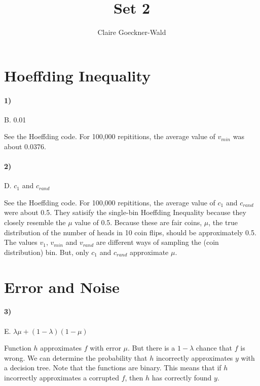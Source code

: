 \documentclass[10pt,letter]{article}
\begin{document}
\title{Set 2}
\author{Claire Goeckner-Wald}
\maketitle 

\section*{Hoeffding Inequality}

\paragraph{1)} B. 0.01

	See the Hoeffding code. For 100,000 repititions, the average value of $v_{min}$ was about 0.0376.

\paragraph{2)} D. $c_1$ and $c_{rand}$

	See the Hoeffding code. For 100,000 repititions, the average value of $c_1$ and $c_{rand}$ were about 0.5. They satisify the single-bin Hoeffding Inequality because they closely resemble the $\mu$ value of 0.5. Because these are fair coins, $\mu$, the true distribution of the number of heads in 10 coin flips, should be approximately 0.5. The values $v_1$, $v_{min}$ and $v_{rand}$ are different ways of sampling the (coin distribution) bin. But, only $c_1$ and $c_{rand}$ approximate $\mu$.

\section*{Error and Noise}

\paragraph{3)} E. $\lambda \mu + (1 - \lambda)(1 - \mu)$

	Function $h$ approximates $f$ with error $\mu$. But there is a $1-\lambda$ chance that $f$ is wrong. We can determine the probability that $h$ incorrectly approximates $y$ with a decision tree. Note that the functions are binary. This means that if $h$ incorrectly approximates a corrupted $f$, then $h$ has correctly found $y$. \newpage
\end{document}
